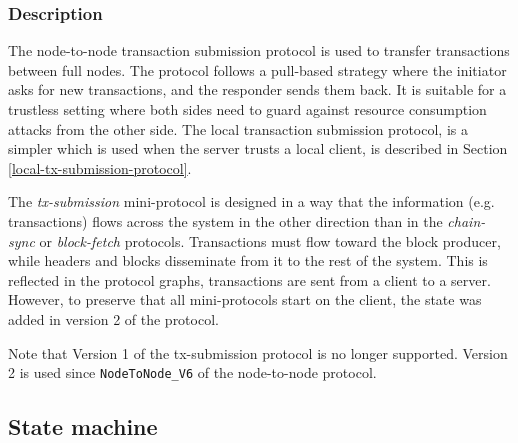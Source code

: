 \subsubsection{Description}
The node-to-node transaction submission protocol is used to transfer
transactions between full nodes.  The protocol follows a pull-based strategy
where the initiator asks for new transactions, and the responder sends them
back.  It is suitable for a trustless setting where both sides need to guard
against resource consumption attacks from the other side.  The local
transaction submission protocol, is a simpler which is used when the server trusts a local
client, is described in Section \ref{local-tx-submission-protocol}.

The \textit{tx-submission} mini-protocol is designed in a way that the
information (e.g. transactions) flows across the system in the other direction
than in the \textit{chain-sync} or \textit{block-fetch} protocols.
Transactions must flow toward the block producer, while headers and blocks
disseminate from it to the rest of the system.  This is reflected in the
protocol graphs, transactions are sent from a client to
a server.  However, to preserve that all mini-protocols start on the client,
the \StInit{} state was added in version 2 of the protocol.

Note that Version 1 of the tx-submission protocol is no longer supported.
Version 2 is used since \texttt{NodeToNode\_V6} of the node-to-node protocol.
\subsection{State machine}

